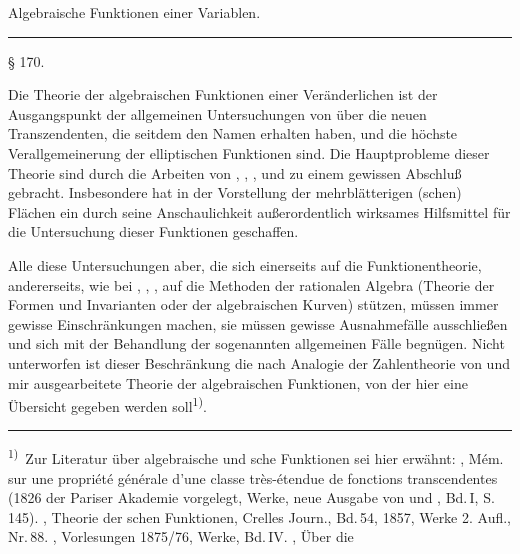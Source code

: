 
\begin{center}

\medskip
{\Large Algebraische Funktionen einer Variablen.}
\end{center}

\rule{5em}{0.4pt}

\begin{center}
§ 170. 
\end{center}

Die Theorie der algebraischen Funktionen einer Veränderlichen ist der
Ausgangspunkt der allgemeinen Untersuchungen von  über
die neuen Transzendenten, die seitdem den Namen \glqq {}\grqq{} erhalten haben, und die höchste Verallgemeinerung
der elliptischen Funktionen sind. Die Hauptprobleme dieser Theorie
sind durch die Arbeiten von , ,
,  und  zu einem
gewissen Abschluß gebracht. Insbesondere hat  in der
Vorstellung der mehrblätterigen (schen) Flächen ein durch seine
Anschaulichkeit außerordentlich wirksames Hilfsmittel für die
Untersuchung dieser Funktionen geschaffen.

Alle diese Untersuchungen aber, die sich einerseits auf die
Funktionentheorie, andererseits, wie bei ,
, , auf die Methoden der rationalen
Algebra (Theorie der Formen und Invarianten oder der algebraischen
Kurven) stützen, müssen immer gewisse Einschränkungen machen, sie
müssen gewisse \glqq Ausnahmefälle\grqq{} ausschließen und sich mit
der Behandlung der sogenannten allgemeinen Fälle begnügen. Nicht
unterworfen ist dieser Beschränkung die nach Analogie der
Zahlentheorie von  und mir ausgearbeitete Theorie
der algebraischen Funktionen, von der hier eine Übersicht gegeben
werden soll\textsuperscript{1)}.

\smallskip
\noindent\rule{5em}{0.4pt}

\noindent\textsuperscript{1)}~Zur Literatur über algebraische und
sche Funktionen sei hier erwähnt: , Mém. sur une
propriété générale d'une classe très-étendue de fonctions
transcendentes (1826 der Pariser Akademie vorgelegt, Werke, neue
Ausgabe von  und , Bd.\,I, S.\,145).
, Theorie der schen Funktionen, Crelles Journ.,
Bd.\,54, 1857, Werke 2. Aufl., Nr.\,88. ,
Vorlesungen 1875/76, Werke, Bd.\,IV. , Über die
